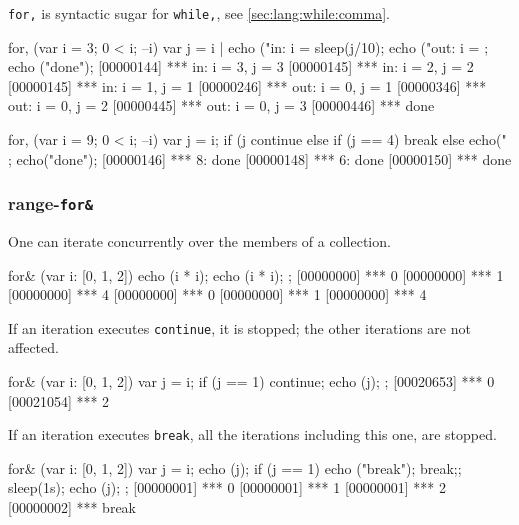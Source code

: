 \lstinline|for,| is syntactic sugar for \lstinline|while,|, see
\autoref{sec:lang:while:comma}.

\begin{urbiscript}
for, (var i = 3; 0 < i; --i)
{
  var j = i |
  echo ("in: i = %
  sleep(j/10);
  echo ("out: i = %
};
echo ("done");
[00000144] *** in: i = 3, j = 3
[00000145] *** in: i = 2, j = 2
[00000145] *** in: i = 1, j = 1
[00000246] *** out: i = 0, j = 1
[00000346] *** out: i = 0, j = 2
[00000445] *** out: i = 0, j = 3
[00000446] *** done
\end{urbiscript}

\begin{urbiscript}
for, (var i = 9; 0 < i; --i)
{
  var j = i;
  if (j %
    continue
  else if (j == 4)
    break
  else
    echo("%
};
echo("done");
[00000146] *** 8: done
[00000148] *** 6: done
[00000150] *** done
\end{urbiscript}


\subsubsection{range-\lstinline{for&}}
\label{sec:lang:for:each:and}

One can iterate concurrently over the members of a collection.

\begin{urbiscript}
for& (var i: [0, 1, 2])
{
  echo (i * i);
  echo (i * i);
};
[00000000] *** 0
[00000000] *** 1
[00000000] *** 4
[00000000] *** 0
[00000000] *** 1
[00000000] *** 4
\end{urbiscript}

If an iteration executes \lstinline{continue}, it is stopped; the
other iterations are not affected.

\begin{urbiscript}
for& (var i: [0, 1, 2])
{
  var j = i;
  if (j == 1)
    continue;
  echo (j);
};
[00020653] *** 0
[00021054] *** 2
\end{urbiscript}

If an iteration executes \lstinline{break}, all the iterations
including this one, are stopped.

\begin{urbiscript}
for& (var i: [0, 1, 2])
{
  var j = i;
  echo (j);
  if (j == 1)
   { echo ("break");
    break;};
  sleep(1s);
  echo (j);
};
[00000001] *** 0
[00000001] *** 1
[00000001] *** 2
[00000002] *** break
\end{urbiscript}


